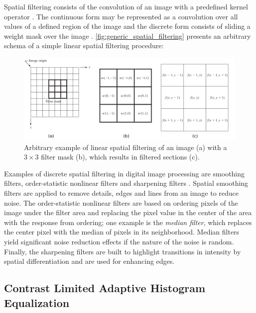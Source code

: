 Spatial filtering consists of the convolution of an image with a predefined kernel operator \cite{gonzalez2018digital}. The continuous form may be represented as a convolution over all values of a defined region of the image and the discrete form consists of sliding a weight mask over the image \cite{wu2008microscope}. \autoref{fig:generic_spatial_filtering} presents an arbitrary schema of a simple linear spatial filtering procedure:

\begin{figure}[htb]
	\centering
	\caption{\label{fig:generic_spatial_filtering} Arbitrary example of linear spatial filtering of an image (a) with a $3 \times 3$ filter mask (b), which results in filtered sections (c).} 
	\begin{center}
	    \includegraphics[scale=0.4]{images/generic_spatial_filtering.png}
	\end{center}
	\centering
\end{figure}

Examples of discrete spatial filtering in digital image processing are smoothing filters, order-statistic nonlinear filters and sharpening filters \cite{gonzalez2018digital}. Spatial smoothing filters are applied to remove details, edges and lines from an image to reduce noise. The order-statistic nonlinear filters are based on ordering pixels of the image under the filter area and replacing the pixel value in the center of the area with the response from ordering; one example is the \emph{median filter}, which replaces the center pixel with the median of pixels in its neighborhood. Median filters yield significant noise reduction effects if the nature of the noise is random. Finally, the sharpening filters are built to highlight transitions in intensity by spatial differentiation and are used for enhancing edges.

\subsection{Contrast Limited Adaptive Histogram Equalization}

